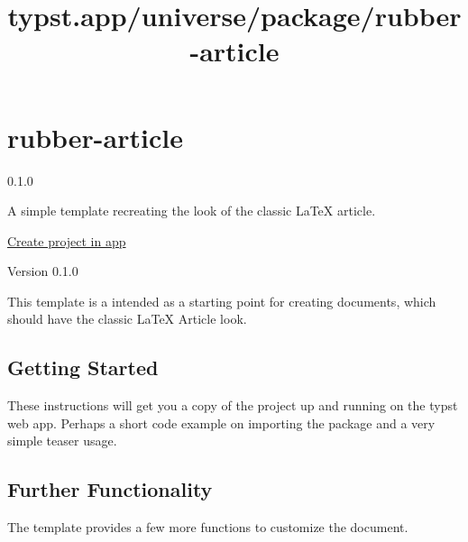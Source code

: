 \title{typst.app/universe/package/rubber-article}

\label{banner}
\label{template-thumbnail}

\section{rubber-article}\label{rubber-article}

{ 0.1.0 }

A simple template recreating the look of the classic LaTeX article.

\href{/app?template=rubber-article&version=0.1.0}{Create project in app}

\label{readme}
Version 0.1.0

This template is a intended as a starting point for creating documents,
which should have the classic LaTeX Article look.

\subsection{Getting Started}\label{getting-started}

These instructions will get you a copy of the project up and running on
the typst web app. Perhaps a short code example on importing the package
and a very simple teaser usage.

\begin{Shaded}
\begin{Highlighting}[]


\NormalTok{  ),}
\NormalTok{)}
\end{Highlighting}
\end{Shaded}

\subsection{Further Functionality}\label{further-functionality}

The template provides a few more functions to customize the document.

\begin{Shaded}
\begin{Highlighting}[]
\NormalTok{)}
\end{Highlighting}
\end{Shaded}

